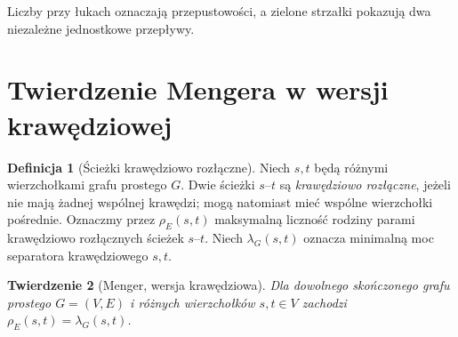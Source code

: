 \documentclass[11pt,a4paper]{report}
\numberwithin{equation}{section}
\theoremstyle{plain}
\newtheorem{twierdzenie}{Twierdzenie}[section]
\theoremstyle{definition}
\newtheorem{definicja}[twierdzenie]{Definicja}
\theoremstyle{remark}
\begin{document}
\begin{center}

{\footnotesize Liczby przy łukach oznaczają przepustowości,
a zielone strzałki pokazują dwa niezależne jednostkowe przepływy.}
\end{center}

\section{Twierdzenie Mengera w wersji krawędziowej}
\label{sec:tg-menger-edges}

\begin{definicja}[Ścieżki krawędziowo rozłączne]
Niech $s,t$ będą różnymi wierzchołkami grafu prostego $G$.
Dwie ścieżki $s$--$t$ są \emph{krawędziowo rozłączne},
jeżeli nie mają żadnej wspólnej krawędzi; mogą natomiast
mieć wspólne wierzchołki pośrednie. Oznaczmy przez
$\rho_E(s,t)$ maksymalną liczność rodziny parami
krawędziowo rozłącznych ścieżek $s$--$t$.
Niech $\lambda_G(s,t)$ oznacza minimalną moc separatora
krawędziowego $s,t$.
\end{definicja}

\begin{twierdzenie}[Menger, wersja krawędziowa]
\label{thm:tg-menger-edge}
Dla dowolnego skończonego grafu prostego $G=(V,E)$
i różnych wierzchołków $s,t\in V$ zachodzi
$\rho_E(s,t)=\lambda_G(s,t)$.
\end{twierdzenie}
\end{document}
